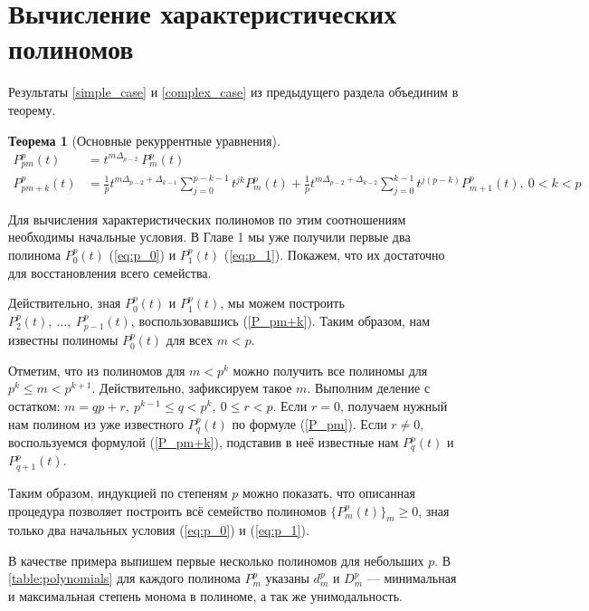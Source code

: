 \documentclass[14pt, a4paper, russian]{report}
\newtheorem{theorem}{\indent Теорема}
\begin{document}
\section{Вычисление характеристических полиномов}
Результаты \cref{simple_case} и \cref{complex_case} из предыдущего раздела объединим в теорему.
\begin{theorem}[Основные рекуррентные уравнения] 
\begin{align}
\label{P_pm} P_{pm}^p(t) & =  t^{m\Delta_{p-2}}\ P_m^p(t) \\
\label{P_pm+k} P_{pm+k}^p(t) & =  \frac{1}{p} t^{m\Delta_{p-2} + \Delta_{k-1}}\sum\limits_{j=0}^{p-k-1} t^{jk} P_m^p(t)  + \frac{1}{p} t^{m\Delta_{p-2} + \Delta_{k-2}}\sum\limits_{j=0}^{k-1} t^{j(p-k)} P_{m+1}^p(t), \ 0 < k < p
\end{align}
\end{theorem}
Для вычисления характеристических полиномов по этим соотношениям необходимы начальные условия. В Главе 1 мы уже получили первые два полинома $P_0^p(t)$ (\ref{eq:p_0}) и $P_1^p(t)$ (\ref{eq:p_1}). Покажем, что их достаточно для восстановления всего семейства. 

Действительно, зная $P_0^p(t)$ и $P_1^p(t)$, мы можем построить $P_2^p(t),\ \ldots
 ,\  P_{p-1}^p(t)$, воспользовавшись (\ref{P_pm+k}). Таким образом, нам известны полиномы $P_0^p(t)$ для всех $m < p$.
 
Отметим, что из полиномов для $m<p^k$ можно получить все полиномы для $p^k \le m < p^{k+1}$. Действительно, зафиксируем такое $m$. Выполним деление с остатком: $m = qp + r, \ p^{k-1} \le q < p^k,\ 0 \le r < p$. Если $r=0$, получаем нужный нам полином из уже известного $P_q^p(t)$ по формуле (\ref{P_pm}). Если $r \ne 0$, воспользуемся формулой (\ref{P_pm+k}), подставив в неё известные нам $P_q^p(t)$ и $P_{q+1}^p(t)$.

Таким образом, индукцией по степеням $p$ можно показать, что описанная процедура позволяет построить всё семейство полиномов $\{P_m^p(t)\}_m \ge 0$, зная только два начальных условия (\ref{eq:p_0}) и  (\ref{eq:p_1}).

В качестве примера выпишем первые несколько полиномов для небольших $p$. В \cref{table:polynomials} для каждого полинома $P_m^p$ указаны $d_m^p$ и $D_m^p$ --- минимальная и максимальная степень монома в полиноме, а так же унимодальность. 
\end{document}

